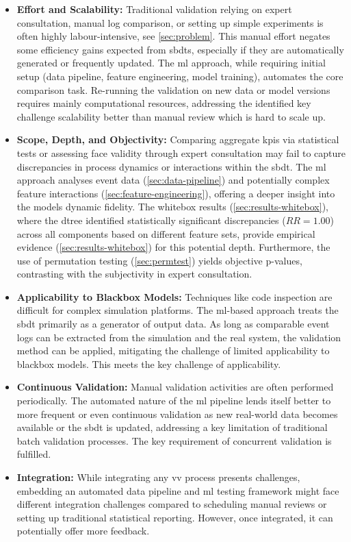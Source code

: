 \begin{itemize}
  \item \textbf{Effort and Scalability:} Traditional validation relying on expert consultation, manual log comparison, or setting up simple experiments is often highly labour-intensive, see \autoref{sec:problem}. This manual effort negates some efficiency gains expected from \gls{sbdt}s, especially if they are automatically generated or frequently updated. The \gls{ml} approach, while requiring initial setup (data pipeline, feature engineering, model training), automates the core comparison task. Re-running the validation on new data or model versions requires mainly computational resources, addressing the identified key challenge scalability better than manual review which is hard to scale up.

  \item \textbf{Scope, Depth, and Objectivity:} Comparing aggregate \gls{kpi}s via statistical tests or assessing face validity through expert consultation may fail to capture discrepancies in process dynamics or interactions within the \gls{sbdt}. The \gls{ml} approach analyses event data (\autoref{sec:data-pipeline}) and potentially complex feature interactions (\autoref{sec:feature-engineering}), offering a deeper insight into the models dynamic fidelity. The whitebox results (\autoref{sec:results-whitebox}), where the \gls{dtree} identified statistically significant discrepancies ($RR=1.00$) across all components based on different feature sets, provide empirical evidence (\autoref{sec:results-whitebox}) for this potential depth. Furthermore, the use of permutation testing (\autoref{sec:permtest}) yields objective p-values, contrasting with the subjectivity in expert consultation.

  \item \textbf{Applicability to Blackbox Models:} Techniques like code inspection are difficult for complex simulation platforms. The \gls{ml}-based approach treats the \gls{sbdt} primarily as a generator of output data. As long as comparable event logs can be extracted from the simulation and the real system, the validation method can be applied, mitigating the challenge of limited applicability to blackbox models. This meets the key challenge of applicability.

  \item \textbf{Continuous Validation:} Manual validation activities are often performed periodically. The automated nature of the \gls{ml} pipeline lends itself better to more frequent or even continuous validation as new real-world data becomes available or the \gls{sbdt} is updated, addressing a key limitation of traditional batch validation processes. The key requirement of concurrent validation is fulfilled.

  \item \textbf{Integration:} While integrating any \gls{vv} process presents challenges, embedding an automated data pipeline and \gls{ml} testing framework might face different integration challenges compared to scheduling manual reviews or setting up traditional statistical reporting. However, once integrated, it can potentially offer more feedback.
\end{itemize}


